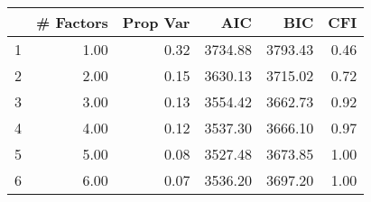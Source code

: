 \begin{table}[ht]
\centering
\begin{tabular}{rrrrrr}
  \hline
 & \# Factors & Prop Var & AIC & BIC & CFI \\ 
  \hline
1 & 1.00 & 0.32 & 3734.88 & 3793.43 & 0.46 \\ 
  2 & 2.00 & 0.15 & 3630.13 & 3715.02 & 0.72 \\ 
  3 & 3.00 & 0.13 & 3554.42 & 3662.73 & 0.92 \\ 
  4 & 4.00 & 0.12 & 3537.30 & 3666.10 & 0.97 \\ 
  5 & 5.00 & 0.08 & 3527.48 & 3673.85 & 1.00 \\ 
  6 & 6.00 & 0.07 & 3536.20 & 3697.20 & 1.00 \\ 
   \hline
\end{tabular}
\end{table}
